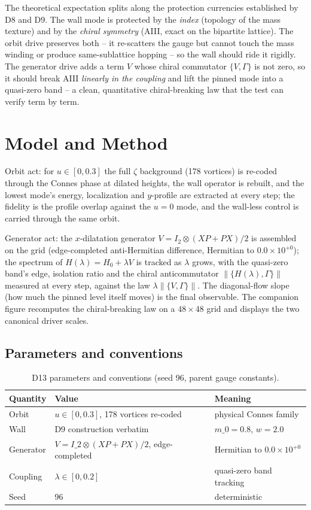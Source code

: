 \documentclass[11pt,a4paper]{article}
\begin{document}
The theoretical expectation splits along the protection currencies established by D8 and D9. The wall mode is protected by the \emph{index} (topology of the mass texture) and by the \emph{chiral symmetry} (AIII, exact on the bipartite lattice). The orbit drive preserves both -- it re-scatters the gauge but cannot touch the mass winding or produce same-sublattice hopping -- so the wall should ride it rigidly. The generator drive adds a term $V$ whose chiral commutator $\{V, \Gamma\}$ is not zero, so it should break AIII \emph{linearly in the coupling} and lift the pinned mode into a quasi-zero band -- a clean, quantitative chiral-breaking law that the test can verify term by term.

\section{Model and Method}
Orbit act: for $u \in [0, 0.3]$ the full $\zeta$ background (178 vortices) is re-coded through the Connes phase at dilated heights, the wall operator is rebuilt, and the lowest mode's energy, localization and $y$-profile are extracted at every step; the fidelity is the profile overlap against the $u = 0$ mode, and the wall-less control is carried through the same orbit.

Generator act: the $x$-dilatation generator $V = I_2 \otimes (XP+PX)/2$ is assembled on the grid (edge-completed anti-Hermitian difference, Hermitian to $0.0\times10^{+0}$); the spectrum of $H(\lambda) = H_0 + \lambda V$ is tracked as $\lambda$ grows, with the quasi-zero band's edge, isolation ratio and the chiral anticommutator $\|\{H(\lambda), \Gamma\}\|$ measured at every step, against the law $\lambda\|\{V, \Gamma\}\|$. The diagonal-flow slope (how much the pinned level itself moves) is the final observable. The companion figure recomputes the chiral-breaking law on a $48\times48$ grid and displays the two canonical driver scales.

\subsection{Parameters and conventions}
\begin{table}[htbp]\centering\small
\begin{tabularx}{\columnwidth}{@{}l l X@{}}
\toprule
Quantity & Value & Meaning \\
\midrule
Orbit & $u \in [0, 0.3]$, 178 vortices re-coded & physical Connes family \\
Wall & D9 construction verbatim & $m\_0 = 0.8$, $w = 2.0$ \\
Generator & $V = I\_2\otimes(XP+PX)/2$, edge-completed & Hermitian to $0.0\times10^{+0}$ \\
Coupling & $\lambda \in [0, 0.2]$ & quasi-zero band tracking \\
Seed & 96 & deterministic \\
\bottomrule
\end{tabularx}
\caption{D13 parameters and conventions (seed 96, parent gauge constants).}
\end{table}
\end{document}
